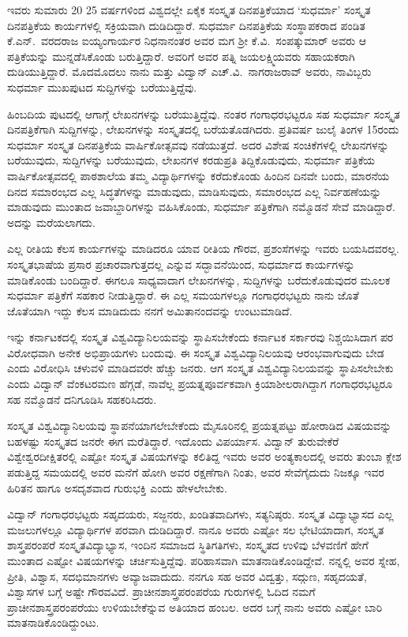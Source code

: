 {ಇವರು ಸುಮಾರು 20  \enginline{-}  25 ವರ್ಷಗಳಿಂದ ವಿಶ್ವದಲ್ಲೇ ಏಕೈಕ ಸಂಸ್ಕೃತ ದಿನಪತ್ರಿಕೆ\-ಯಾದ ‘ಸುಧರ್ಮಾ’ ಸಂಸ್ಕೃತ ದಿನಪತ್ರಿಕೆಯ ಕಾರ್ಯಗಳಲ್ಲಿ ಸಕ್ರಿಯವಾಗಿ ದುಡಿದಿದ್ದಾರೆ. ಸುಧರ್ಮಾ ದಿನಪತ್ರಿಕೆಯ ಸಂಸ್ಥಾಪಕರಾದ ಪಂಡಿತ ಕೆ.ಎನ್.\ ವರದರಾಜ ಐಯ್ಯಂಗಾರ್ಯರ ನಿಧನಾನಂತರ ಅವರ ಮಗ ಶ್ರೀ ಕೆ.ವಿ.\ ಸಂಪತ್ಕುಮಾರ್ ಅವರು ಆ ಪತ್ರಿಕೆಯನ್ನು ಮುನ್ನಡೆಸಿಕೊಂಡು ಬರುತ್ತಿದ್ದಾರೆ. ಅವರಿಗೆ ಅವರ ಪತ್ನಿ ಜಯಲಕ್ಷ್ಮಿಯವರು ಸಹಾಯಕರಾಗಿ ದುಡಿಯುತ್ತಿದ್ದಾರೆ. ಮೊದಮೊದಲು ನಾನು ಮತ್ತು ವಿದ್ವಾನ್ ಎಚ್.ವಿ.\ ನಾಗರಾಜರಾವ್ ಅವರು, ನಾವಿಬ್ಬರು ಸುಧರ್ಮಾ ಮುಖಪುಟದ ಸುದ್ದಿಗಳನ್ನು ಬರೆಯುತ್ತಿದ್ದೆವು. 
\vskip 3pt

ಹಿಂಬದಿಯ ಪುಟದಲ್ಲಿ ಆಗಾಗ್ಗೆ ಲೇಖನಗಳನ್ನು ಬರೆಯುತ್ತಿದ್ದೆವು. ನಂತರ ಗಂಗಾಧರಭಟ್ಟರೂ ಸಹ ಸುಧರ್ಮಾ ಸಂಸ್ಕೃತ ದಿನಪತ್ರಿಕೆಗಾಗಿ ಸುದ್ದಿಗಳನ್ನು, ಲೇಖನಗಳನ್ನು ಸಂಸ್ಕೃತದಲ್ಲಿ ಬರೆಯತೊಡಗಿದರು. ಪ್ರತಿವರ್ಷ ಜುಲೈ ತಿಂಗಳ 15ರಂದು ಸುಧರ್ಮಾ ಸಂಸ್ಕೃತ ದಿನಪತ್ರಿಕೆಯ ವಾರ್ಷಿಕೋತ್ಸವವು ನಡೆಯುತ್ತದೆ. ಅದರ ವಿಶೇಷ ಸಂಚಿಕೆಗಳಲ್ಲಿ ಲೇಖನಗಳನ್ನು ಬರೆಯುವುದು, ಸುದ್ದಿಗಳನ್ನು ಬರೆಯುವುದು, ಲೇಖನಗಳ ಕರಡುಪ್ರತಿ ತಿದ್ದಿಕೊಡುವುದು, ಸುಧರ್ಮಾ ಪತ್ರಿಕೆಯ ವಾರ್ಷಿಕೋತ್ಸವದಲ್ಲಿ ಪಾಠ\-ಶಾಲೆಯ ತಮ್ಮ ವಿದ್ಯಾರ್ಥಿಗಳನ್ನು ಕರೆದುಕೊಂಡು ಹಿಂದಿನ ದಿನವೇ ಬಂದು, ಮಾರನೆಯ ದಿನದ ಸಮಾರಂಭದ ಎಲ್ಲ ಸಿದ್ಧತೆಗಳನ್ನು ಮಾಡುವುದು, ಮಾಡಿಸುವುದು, ಸಮಾರಂಭದ ಎಲ್ಲ ನಿರ್ವಹಣೆಯನ್ನು ಮಾಡುವುದು ಮುಂತಾದ ಜವಾಬ್ದಾರಿಗಳನ್ನು ವಹಿಸಿಕೊಂಡು, ಸುಧರ್ಮಾ ಪತ್ರಿಕೆಗಾಗಿ ನಮ್ಮೊಡನೆ ಸೇವೆ ಮಾಡಿದ್ದಾರೆ. ಅದನ್ನು ಮರೆಯಲಾಗದು. 
\vskip 3pt

ಎಲ್ಲ ರೀತಿಯ ಕೆಲಸ ಕಾರ್ಯಗಳನ್ನು ಮಾಡಿದರೂ ಯಾವ ರೀತಿಯ ಗೌರವ, ಪ್ರಶಂಸೆಗಳನ್ನು ಇವರು ಬಯಸಿದವರಲ್ಲ. ಸಂಸ್ಕೃತಭಾಷೆಯ ಪ್ರಸಾರ  \enginline{-}  ಪ್ರಚಾರ\-ವಾಗುತ್ತದಲ್ಲ ಎನ್ನುವ ಸದ್ಭಾವನೆಯಿಂದ, ಸುಧರ್ಮಾದ ಕಾರ್ಯಗಳನ್ನು ಮಾಡಿಕೊಂಡು ಬಂದಿದ್ದಾರೆ. ಈಗಲೂ ಸಾಧ್ಯವಾದಾಗ ಲೇಖನಗಳನ್ನು, ಸುದ್ದಿಗಳನ್ನು ಬರೆದು\-ಕೊಡುವುದರ ಮೂಲಕ ಸುಧರ್ಮಾ ಪತ್ರಿಕೆಗೆ ಸಹಕಾರ ನೀಡುತ್ತಿದ್ದಾರೆ. ಈ ಎಲ್ಲ ಸಮಯ\-ಗಳಲ್ಲೂ ಗಂಗಾಧರಭಟ್ಟರು ನಾನು ಜೊತೆ ಜೊತೆಯಾಗಿ ಇದ್ದು ಕೆಲಸ ಮಾಡಿದುದು ನನಗೆ ಅಮಿತಾನಂದವನ್ನು ಉಂಟುಮಾಡಿದೆ.
\vskip 3pt

ಇನ್ನು ಕರ್ನಾಟಕದಲ್ಲಿ ಸಂಸ್ಕೃತ ವಿಶ್ವವಿದ್ಯಾನಿಲಯವನ್ನು ಸ್ಥಾಪಿಸಬೇಕೆಂದು ಕರ್ನಾಟಕ ಸರ್ಕಾರವು ನಿಶ್ಚಯಿಸಿದಾಗ ಪರ  \enginline{-}  ವಿರೋಧವಾಗಿ ಅನೇಕ ಅಭಿಪ್ರಾಯಗಳು ಬಂದುವು. ಈ ಸಂಸ್ಕೃತ ವಿಶ್ವವಿದ್ಯಾನಿಲಯವು ಆರಂಭವಾಗುವುದು ಬೇಡ ಎಂದು ವಿರೋಧಿಸಿ ಚಳುವಳಿ ಮಾಡಿದವರೇ ಹೆಚ್ಚು ಜನರು. ಆಗ ಸಂಸ್ಕೃತ ವಿಶ್ವವಿದ್ಯಾ\-ನಿಲಯವನ್ನು ಸ್ಥಾಪಿಸಲೇಬೇಕು ಎಂದು ವಿದ್ವಾನ್ ವೆಂಕಟರಮಣ ಹೆಗ್ಗಡೆ, ನಾವೆಲ್ಲ ಪ್ರಯತ್ನ\-ಪೂರ್ವಕವಾಗಿ ಕ್ರಿಯಾಶೀಲರಾಗಿದ್ದಾಗ ಗಂಗಾಧರಭಟ್ಟರೂ ಸಹ ನಮ್ಮೊಡನೆ ದನಿ\-ಗೂಡಿಸಿ ಸಹಕರಿಸಿದರು.     

ಸಂಸ್ಕೃತ ವಿಶ್ವವಿದ್ಯಾನಿಲಯವು ಸ್ಥಾಪನೆಯಾಗಲೇಬೇಕೆಂದು ಮೈಸೂರಿನಲ್ಲಿ ಪ್ರಯತ್ನ\-ಪಟ್ಟು ಹೋರಾಡಿದ ವಿಷಯವನ್ನು ಬಹಳಷ್ಟು ಸಂಸ್ಕೃತದ ಜನರೇ ಈಗ ಮರೆತಿದ್ದಾರೆ. ಇದೊಂದು ವಿಪರ್ಯಾಸ. ವಿದ್ವಾನ್ ತುರುವೇಕೆರೆ ವಿಶ್ವೇಶ್ವರದೀಕ್ಷಿತರಲ್ಲಿ ಎಷ್ಟೋ ಸಂಸ್ಕೃತ ವಿಷಯಗಳನ್ನು ಕಲಿತಿದ್ದ ಇವರು ಅವರ ಅಂತ್ಯಕಾಲದಲ್ಲಿ ಅವರು ತುಂಬಾ ಕ್ಲೇಶ ಪಡುತ್ತಿದ್ದ ಸಮಯದಲ್ಲಿ ಅವರ ಮನೆಗೆ ಹೋಗಿ ಅವರ ರಕ್ಷಣೆಗಾಗಿ ನಿಂತು, ಅವರ ಸೇವೆಗೈದುದು ನಿಜಕ್ಕೂ ಇವರ ಹಿರಿತನ ಹಾಗೂ ಅಸದೃಶವಾದ ಗುರುಭಕ್ತಿ ಎಂದು ಹೇಳಲೇಬೇಕು.

ವಿದ್ವಾನ್ ಗಂಗಾಧರಭಟ್ಟರು ಸಹೃದಯರು, ಸಜ್ಜನರು, ಖಂಡಿತವಾದಿಗಳು, ಸತ್ಯ\-ನಿಷ್ಠರು. ಸಂಸ್ಕೃತ ವಿದ್ಯಾಭ್ಯಾಸದ ಎಲ್ಲ ಮಜಲುಗಳಲ್ಲೂ ವಿದ್ಯಾರ್ಥಿಗಳ ಪರವಾಗಿ ದುಡಿದಿದ್ದಾರೆ. ನಾನೂ ಅವರು ಎಷ್ಟೋ ಸಲ ಭೇಟಿಯಾದಾಗ, ಸಂಸ್ಕೃತ ಶಾಸ್ತ್ರಪರಂಪರೆ  \enginline{-}  ಸಂಸ್ಕೃತವಿದ್ಯಾಭ್ಯಾಸ, ಇಂದಿನ ಸಮಾಜದ ಸ್ಥಿತಿಗತಿಗಳು, ಸಂಸ್ಕೃತದ ಉಳಿವು  \enginline{-}  ಬೆಳವಣಿಗೆ ಹೇಗೆ ಮುಂತಾದ ಎಷ್ಟೋ ವಿಷಯಗಳನ್ನು ಚರ್ಚಿಸುತ್ತಿದ್ದೆವು. ಪರಿಹಾಸವಾಗಿ ಮಾತನಾಡಿಕೊಂಡಿದ್ದೇವೆ. ನನ್ನಲ್ಲಿ ಅವರ ಸ್ನೇಹ, ಪ್ರೀತಿ, ವಿಶ್ವಾಸ, ಸದಭಿಮಾನಗಳು ಅವ್ಯಾಜವಾದುದು. ನನಗೂ ಸಹ ಅವರ ವಿದ್ವತ್ತು, ಸದ್ಗುಣ, ಸಹೃದಯತೆ, ವಿಶ್ವಾಸಗಳ ಬಗ್ಗೆ ಅಷ್ಟೇ ಗೌರವವಿದೆ. ಪ್ರಾಚೀನಶಾಸ್ತ್ರಪರಂಪರೆಯ ಗುರುಗಳಲ್ಲಿ ಓದಿದ ನಮಗೆ ಪ್ರಾಚೀನಶಾಸ್ತ್ರಪರಂಪರೆಯು ಉಳಿಯಬೇಕೆನ್ನುವ ಅತಿಯಾದ ಹಂಬಲ. ಅದರ ಬಗ್ಗೆ ನಾನು ಅವರು ಎಷ್ಟೋ ಬಾರಿ ಮಾತನಾಡಿಕೊಂಡಿದ್ದುಂಟು.

}
